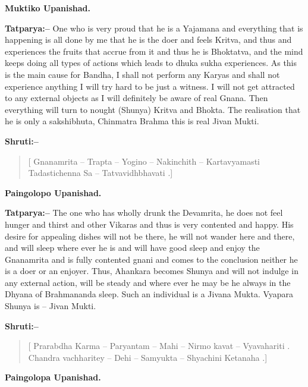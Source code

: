 \begin{flushright}
\textbf{Muktiko Upanishad.}
\end{flushright}

\textbf{Tatparya:–} One who is very proud that he is a Yajamana and everything that is happening is all done by me that he is the doer and feels Kritva, and thus and experiences the fruits that accrue from it and thus he is Bhoktatva, and the mind keeps doing all types of actions which leads to dhuka sukha experiences. As this is the main cause for Bandha, I shall not perform any Karyas and shall not experience anything I will try hard to be just a witness. I will not get attracted to any external objects as I will definitely be aware of real Gnana. Then everything will turn to nought (Shunya) Kritva and Bhokta. The realisation that he is only a sakshibhuta, Chinmatra Brahma this is real Jivan Mukti.

\textbf{Shruti:–}

\begin{verse}
[ Gnanamrita – Trapta – Yogino – Nakinchith – Kartavyamasti  Tadastichenna Sa – Tatvavidhbhavati .]
\end{verse}

\begin{flushright}
\textbf{Paingolopo Upanishad.}
\end{flushright}

\textbf{Tatparya:–} The one who has wholly drunk the Devamrita, he does not feel hunger and thirst and other Vikaras and thus is very contented and happy. His desire for appealing dishes will not be there, he will not wander here and there, and will sleep where ever he is and will have good sleep and enjoy the Gnanamrita and is fully contented gnani and comes to the conclusion neither he is a doer or an enjoyer. Thus, Ahankara becomes Shunya and will not indulge in any external action, will be steady and where ever he may be he always in the Dhyana of Brahmananda sleep. Such an individual is a Jivana Mukta. Vyapara Shunya is – Jivan Mukti.

\textbf{Shruti:–}

\begin{verse}
[ Prarabdha Karma – Paryantam – Mahi – Nirmo kavat – Vyavahariti . Chandra vachharitey – Dehi – Samyukta – Shyachini Ketanaha .]
\end{verse}

\begin{flushright}
\textbf{Paingolopa Upanishad.}
\end{flushright}

